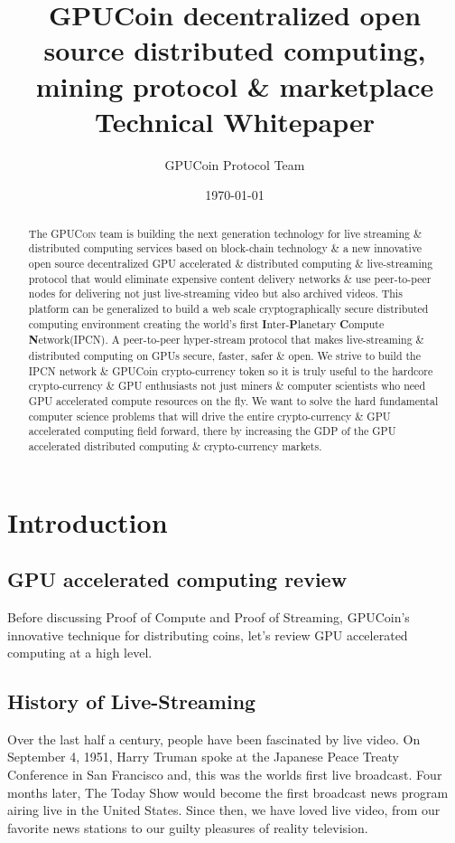 \documentclass{article}
\title{GPUCoin decentralized 
open source 
 distributed computing, mining protocol \& marketplace Technical Whitepaper}
\author{GPUCoin Protocol Team}
\date{\today}
\begin{document}
\maketitle

\begin{abstract}
The \textsc{GPUCoin} team is building the next generation technology for live streaming \& distributed computing services based on block-chain technology \& a new innovative open source decentralized GPU accelerated \& distributed computing \& live-streaming protocol that would eliminate expensive content delivery networks \& use peer-to-peer nodes for delivering not just live-streaming video but also archived videos. This platform can be generalized to build a web scale cryptographically secure distributed computing environment creating the world's first \textbf{I}nter-\textbf{P}lanetary \textbf{C}ompute \textbf{N}etwork(\textsc{IPCN}). A peer-to-peer hyper-stream protocol that makes live-streaming \& distributed computing on GPUs secure, faster, safer \& open. We strive to build the IPCN network \& GPUCoin crypto-currency token so it is truly useful to the hardcore crypto-currency \& GPU enthusiasts not just miners \& computer scientists who need GPU accelerated compute resources on the fly. We want to solve the hard fundamental computer science problems that will drive the entire crypto-currency \& GPU accelerated computing field forward, there by increasing the GDP of the GPU accelerated distributed computing \& crypto-currency markets.

\end{abstract}
\newpage

\tableofcontents
\newpage

\section{Introduction}
\subsection{GPU accelerated computing review}
Before discussing Proof of Compute and Proof of Streaming, GPUCoin's innovative technique for distributing coins, let’s review GPU accelerated computing at a high level.


\subsection{History of Live-Streaming}
Over the last half a century, people have been fascinated by live video. On September 4, 1951, Harry Truman spoke at the Japanese Peace Treaty Conference in San Francisco and, this was the worlds first live broadcast. Four months later, The Today Show would become the first broadcast news program airing live in the United States. Since then, we have loved live video, from our favorite news stations to our guilty pleasures of reality television.
\end{document}
